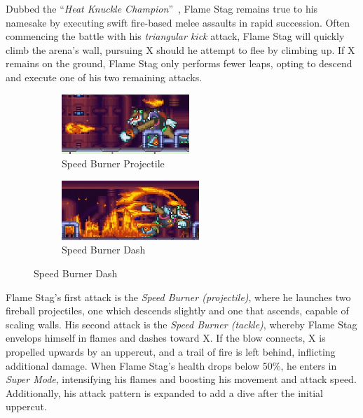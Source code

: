 Dubbed the ``\textit{Heat Knuckle Champion}''~\cite{book:MMX_Complete_art}, Flame Stag remains true to his namesake by executing swift fire-based melee assaults in rapid succession. Often commencing the battle with his \emph{triangular kick} attack, Flame Stag will quickly climb the arena's wall, pursuing X should he attempt to flee by climbing up. If X remains on the ground, Flame Stag only performs fewer leaps, opting to descend and execute one of his two remaining attacks.\begin{figure}[htp]
	\centering
	\begin{subfigure}{0.45\linewidth}
		\centering
		\includegraphics[height= 2.25cm]{figures/X2/Flame_stag/Stag_projectile.png}
		\caption{Speed Burner Projectile}
	\end{subfigure}
	\begin{subfigure}{0.45\linewidth}
		\centering
		\includegraphics[height=2.25cm]{figures/X2/Flame_stag/Stag_dash.png}
		\caption{Speed Burner Dash}
	\end{subfigure}
\end{figure} Flame Stag's first attack is the \emph{Speed Burner (projectile)}, where he launches two fireball projectiles, one which descends slightly and one that ascends, capable of scaling walls. His second attack is the \emph{Speed Burner (tackle)}, whereby Flame Stag envelops himself in flames and dashes toward X. If the blow connects, X is propelled upwards by an uppercut, and a trail of fire is left behind, inflicting additional damage. When Flame Stag's health drops below 50\%, he enters in \emph{Super Mode}, intensifying his flames and boosting his movement and attack speed. Additionally, his attack pattern is expanded to add a dive after the initial uppercut.

